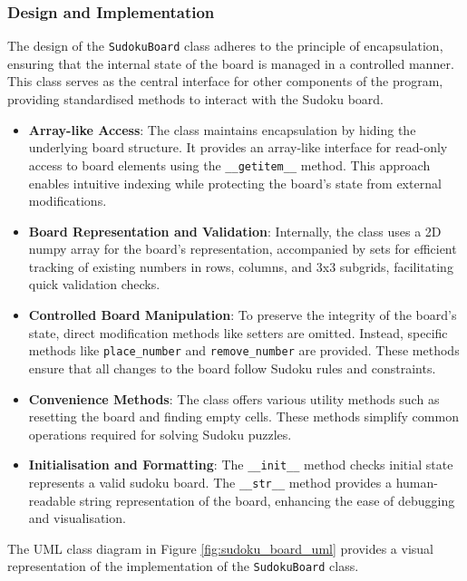 \documentclass[11pt]{article}
\begin{document}
\subsubsection{Design and Implementation}

The design of the \texttt{SudokuBoard} class adheres to the principle of encapsulation, ensuring that the internal state of the board is managed in a controlled manner. This class serves as the central interface for other components of the program, providing standardised methods to interact with the Sudoku board.

\begin{itemize}
\item \textbf{Array-like Access}: The class maintains encapsulation by hiding the underlying board structure. It provides an array-like interface for read-only access to board elements using the \texttt{\_\_getitem\_\_} method. This approach enables intuitive indexing while protecting the board's state from external modifications.

\item \textbf{Board Representation and Validation}: Internally, the class uses a 2D numpy array for the board's representation, accompanied by sets for efficient tracking of existing numbers in rows, columns, and 3x3 subgrids, facilitating quick validation checks.

\item \textbf{Controlled Board Manipulation}: To preserve the integrity of the board's state, direct modification methods like setters are omitted. Instead, specific methods like \texttt{place\_number} and \texttt{remove\_number} are provided. These methods ensure that all changes to the board follow Sudoku rules and constraints.

\item \textbf{Convenience Methods}: The class offers various utility methods such as resetting the board and finding empty cells. These methods simplify common operations required for solving Sudoku puzzles.

\item \textbf{Initialisation and Formatting}: The \texttt{\_\_init\_\_} method checks initial state represents a valid sudoku board. The \texttt{\_\_str\_\_} method provides a human-readable string representation of the board, enhancing the ease of debugging and visualisation.
\end{itemize}

The UML class diagram in Figure \ref{fig:sudoku_board_uml} provides a visual representation of the implementation of the \texttt{SudokuBoard} class.
\end{document}

